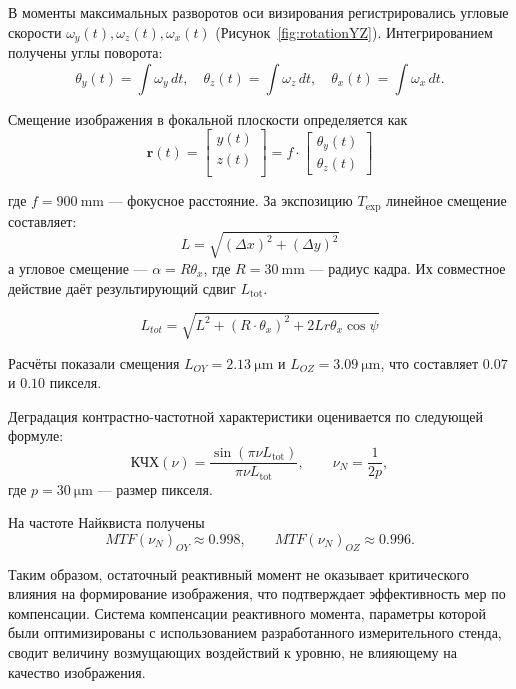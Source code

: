 В моменты максимальных разворотов оси визирования регистрировались угловые скорости
$\omega_y(t), \omega_z(t), \omega_x(t)$ (Рисунок~\cref{fig:rotationYZ}).
Интегрированием получены углы поворота:
\begin{equation}
	\theta_y(t)=\int \omega_y\,dt,\quad
	\theta_z(t)=\int \omega_z\,dt,\quad
	\theta_x(t)=\int \omega_x\,dt.
\end{equation}

Смещение изображения в фокальной плоскости определяется как
\begin{equation}
	\label{eq:bias}
	\mathbf{r}(t) = 
	\begin{bmatrix}
		y(t) \\
		z(t) \\
	\end{bmatrix}
	= f \cdot
	\begin{bmatrix}
		\theta_{y}(t) \\
		\theta_{z}(t)
	\end{bmatrix}
\end{equation}

где $f=\SI{900}{\milli\meter}$ — фокусное расстояние.
За экспозицию $T_{\mathrm{exp}}$ линейное смещение составляет:
 \begin{equation}
	\label{eq:biasL}
	L=\sqrt{(\Delta x)^2+(\Delta y)^2}
\end{equation}
а угловое смещение — $\alpha=R\theta_x$, где $R=\SI{30}{\milli\meter}$ — радиус кадра.
Их совместное действие даёт результирующий сдвиг $L_{\mathrm{tot}}$.

 \begin{equation}
	\label{eq:L_total}
	L_{tot} = \sqrt{L^2 + (R\cdot \theta_x)^2 + 2Lr\theta_x\cos{\psi}}
\end{equation}

Расчёты показали смещения
$L_{OY}=\SI{2.13}{\micro\meter}$ и
$L_{OZ}=\SI{3.09}{\micro\meter}$,
что составляет $0.07$ и $0.10$ пикселя.

Деградация контрастно-частотной характеристики оценивается по следующей формуле:
\begin{equation}
	\text{КЧХ}(\nu)=\frac{\sin(\pi\nu L_{\mathrm{tot}})}{\pi\nu L_{\mathrm{tot}}},\qquad
	\nu_N=\frac{1}{2p},
\end{equation}
где $p=\SI{30}{\micro\meter}$ — размер пикселя.

 На частоте Найквиста получены
\[
MTF(\nu_N)_{OY}\approx 0.998,\qquad
MTF(\nu_N)_{OZ}\approx 0.996.
\]

Таким образом, остаточный реактивный момент не оказывает критического
влияния на формирование изображения, что подтверждает эффективность
мер по компенсации. Система компенсации реактивного момента,
параметры которой были оптимизированы с использованием разработанного
измерительного стенда, сводит величину возмущающих воздействий к
уровню, не влияющему на качество изображения.


